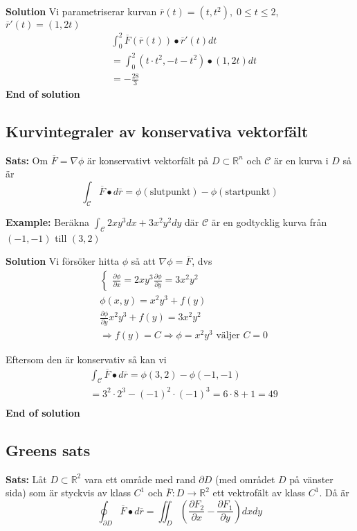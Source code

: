 \textbf{Solution}
Vi parametriserar kurvan $\overline{r}(t) = (t,t^2),\; 0\leq t\leq 2$, $\overline{r}'(t) = (1,2t)$
\begin{align*}
    &\int^{2}_{0} \overline{F}(\overline{r}(t)) \bullet \overline{r}'(t)dt \\
    &=\int^{2}_{0} (t\cdot t^2, -t -t^2) \bullet (1,2t)dt \\
    &=-\frac{28}{3}
\end{align*}
\textbf{End of solution}

\subsection{Kurvintegraler av konservativa vektorfält}

\textbf{Sats:} Om $\overline{F} = \nabla\phi$ är konservativt vektorfält på 
$D\subset\mathbb{R}^n$ och $\mathcal{C}$ är en kurva i $D$ så är
\begin{equation*}
    \int_{\mathcal{C}} \overline{F}\bullet d\overline{r} = \phi(\text{slutpunkt}) - \phi(\text{startpunkt})
\end{equation*}

\textbf{Example:}
Beräkna $\int_{\mathcal{C}} 2xy^3dx + 3x^2y^2dy$ där $\mathcal{C}$ är en
godtycklig kurva från $(-1,-1)$ till $(3,2)$

\textbf{Solution}
Vi försöker hitta $\phi$ så att $\nabla\phi=\overline{F}$, dvs
\begin{align*}
    &\begin{cases}
        \frac{\partial\phi}{\partial x} = 2xy^3
        \frac{\partial\phi}{\partial y} = 3x^2y^2
    \end{cases} \\
    &\phi(x,y) = x^2y^3 + f(y) \\
    &\frac{\partial\phi}{\partial y} x^2y^3 + f(y) = 3x^2y^2 \\
    &\Rightarrow f(y) = C \Rightarrow \phi = x^2y^3 \text{ väljer } C=0
\end{align*}

Eftersom den är konservativ så kan vi
\begin{align*}
    &\int_{\mathcal{C}} \overline{F}\bullet d\overline{r} = \phi(3,2) - \phi(-1,-1) \\
    &= 3^2\cdot2^3 - (-1)^2\cdot(-1)^3 = 6\cdot8 + 1 = 49 \\
\end{align*}
\textbf{End of solution}


\subsection{Greens sats}
\textbf{Sats:} Låt $D\subset\mathbb{R}^2$ vara ett område med rand $\partial D$ 
(med området $D$ på vänster sida) som är styckvis av klass $C^1$ och $\overline{F}:D\to\mathbb{R}^2$
ett vektrofält av klass $C^1$. Då är 
\begin{equation*}
    \oint_{\partial D} \overline{F}\bullet d\overline{r} = \iint_{D} \left(\frac{\partial F_2}{\partial x} - \frac{\partial F_1}{\partial y}\right)dxdy
\end{equation*}

